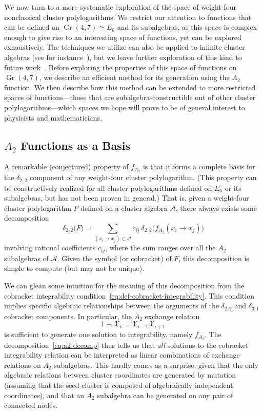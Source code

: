 \documentclass[11pt]{article}
\DeclareMathOperator{\Gr}{Gr}
\def\x{\mathcal{X}}
\def\a{\mathcal{A}}
\def\pdfeq#1{\texorpdfstring{$#1$}{a}}
\begin{document}
We now turn to a more systematic exploration of the space of weight-four nonclassical cluster polylogarithms. We restrict our attention to functions that can be defined on $\Gr(4,7) \simeq E_6$ and its subalgebras, as this space is complex enough to give rise to an interesting space of functions, yet can be explored exhaustively. The techniques we utilize can also be applied to infinite cluster algebras (see for instance~\cite{Golden:2014xqa}), but we leave further exploration of this kind to future work~\cite{cluster_subalgebras_ii}. Before exploring the properties of this space of functions on $\Gr(4,7)$, we describe an efficient method for its generation using the $A_2$ function. We then describe how this method can be extended to more restricted spaces of functions---those that are subalgebra-constructible out of other cluster polylogarithms---which spaces we hope will prove to be of general interest to physicists and mathematicians. 

\subsection{\pdfeq{A_2} Functions as a Basis}

A remarkable (conjectured) property of $f_{A_2}$ is that it forms a complete basis for the $\delta_{2,2}$ component of any weight-four cluster polylogarithm. (This property can be constructively realized for all cluster polylogarithms defined on $E_6$ or its subalgebras, but has not been proven in general.) That is, given a weight-four cluster polylogarithm $F$ defined on a cluster algebra $\a$, there always exists some decomposition
\begin{equation}\label{eq:a2-decomp}
	\delta_{2,2} \big(F\big) = \sum_{(x_i\to x_j) \subset \a} c_{ij} ~\delta_{2,2}\big(f_{A_2}(x_i \to x_j) \big)
\end{equation}
involving rational coefficients $c_{ij}$, where the sum ranges over all the $A_2$ subalgebras of $\a$. Given the symbol (or cobracket) of $F$, this decomposition is simple to compute (but may not be unique). 

We can glean some intuition for the meaning of this decomposition from the cobracket integrability condition~\eqref{eq:def-cobracket-integrability}. This condition implies specific algebraic relationships between the arguments of the $\delta_{2,2}$ and $\delta_{3,1}$ cobracket components. In particular, the $A_2$ exchange relation
\begin{equation}
	1+\x_i = \x_{i-1}\x_{i+1}
\end{equation}
is sufficient to generate one solution to integrability, namely $f_{A_2}$. The decomposition~\eqref{eq:a2-decomp} thus tells us that \emph{all} solutions to the cobracket integrability relation can be interpreted as linear combinations of exchange relations on $A_2$ subalgebras. This hardly comes as a surprise, given that the only algebraic relations between cluster coordinates are generated by mutation (assuming that the seed cluster is composed of algebraically independent coordinates), and that an $A_2$ subalgebra can be generated on any pair of connected nodes.
\end{document}
